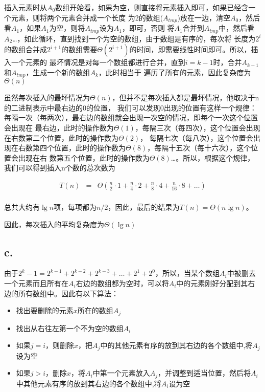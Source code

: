 \documentclass{article}
\begin{document}
\begin{CJK}{UTF8}{gbsn}
插入元素时从$A_0$数组开始看，如果为空，则直接将元素插入即可，如果已经含一个元素，则将两个元素合并成一个长度
为2的数组($A_{tmp}$)放在一边，清空$A_0$，然后看$A_1$，如果$A_1$为空，则将$A_{tmp}$设为$A_1$，即可，否则
将$A_1$合并到$A_{tmp}$中，然后看$A_2$\ldots，如此循环，直到找到一个为空的数组，由于数组是有序的，每次将
长度为$2^i$的数组合并成$2^{i+1}$的数组需要$\Theta(2^{i+1})$的时间，即需要线性时间即可。所以，插入一个元素的
最坏情况是对每一个数组都进行合并，直到$i=k-1$时，合并$A_{k-1}$和$A_{tmp}$，生成一个新的数组$A_k$，此时相当于
遍历了所有的元素，因此复杂度为$\Theta(n)$

虽然每次插入的最坏情况为$\Theta(n)$，但并不是每次插入都是最坏情况，他取决于n的二进制表示中最右边的0的位置，
我们可以发现0出现的位置有这样一个规律：每隔一次（每两次），最右边的数组就会出现一次空的情况，即每个一次这个位置会出现在
最右边，此时的操作数为$\Theta(1)$，每隔三次（每四次），这个位置会出现在右数第二个位置，此时的操作数为$\Theta(2)$，
每隔七次（每八次），这个位置会出现在右数第四个位置，此时的操作数为$\Theta(8)$，每隔十五次（每十六次），这个位置会出现在右
数第五个位置，此时的操作数为$\Theta(8)$\ldots。所以，根据这个规律，我们可以得到插入n个数的总次数为

\begin{eqnarray*}
T(n)&=& \Theta(\frac{n}{2}\cdot 1 + \frac{n}{4}\cdot 2 + \frac{n}{8}\cdot 4 +
\frac{n}{16}\cdot 8 + \ldots )\\
\end{eqnarray*}

总共大约有$\lg n$项，每项都为$n/2$，因此，最后的结果为$T(n) = \Theta(n \lg n)$。

因此，每次插入的平均复杂度为$\Theta(\lg n)$

\subsection*{c.}

由于$2^k -1 = 2^{k-1} + 2^{k-2} + 2^{k-3} + \ldots + 2^1 + 2^0$，所以，当某个数组$A_i$中被删去
一个元素而且所有在$A_i$右边的数组都为空时，可以将$A_i$中的元素刚好分配到其右边的所有数组中。因此有以下算法：
\begin{itemize}
  \item 找出要删除的元素$x$所在的数组$A_j$
  \item 找出从右往左第一个不为空的数组$A_i$
  \item 如果$j = i$，则删除$x$，把$A_j$中的其他元素有序的放到其右边的各个数组中,将$A_j$设为空
  \item 如果$j>i$，删除$x$，将$A_i$中第一个元素放入$A_j$，并调整到适当位置，然后将$A_i$中其他元素有序的放到其右边的各个数组中,将$A_i$设为空
\end{itemize}

\end{CJK}
\end{document}

